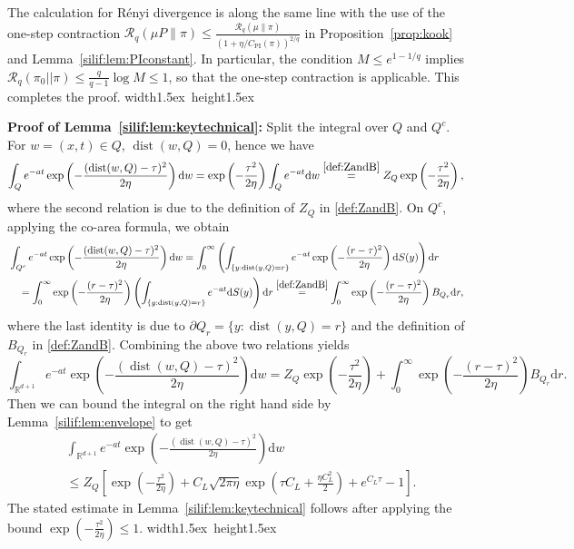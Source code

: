 \documentclass[11pt,letterpaper]{article}
\newcommand{\R}{\mathbb{R}}
\newcommand{\dist}{\operatorname{dist}}
\newcommand{\D}{\mathrm{d}}
\newcommand{\brac}[1]{\left( #1\right)}
\newcommand*{\QEDA}{\hfill\hbox{\vrule width1.5ex height1.5ex}}
\begin{document}
The calculation for R\'{e}nyi divergence is along the same line with the use of the one-step contraction $\mathcal{R}_q(\mu P\|\pi)\le \frac{\mathcal{R}_q(\mu\|\pi)}{(1+\eta/C_{\mathrm{PI}}(\pi))^{2/q}}$ in Proposition~\ref{prop:kook} and Lemma~\ref{silif:lem:PIconstant}. In particular, the condition $M\leq e^{1-1/q}$ implies $\mathcal{R}_q\brac{\pi_0||\pi}\leq \frac{q}{q-1}\log M\leq 1$, so that the one-step contraction is applicable. This completes the proof. 
\QEDA



\medskip
\textbf{Proof of Lemma~\ref{silif:lem:keytechnical}:}    
Split the integral over $Q$ and $  Q^c$. For $w=(x,t) \in Q$, $\dist(w,Q)=0$, hence we have
\[
\int_Q e^{-a t}\exp \left(-\frac{(\dist(w,Q)-\tau)^2}{2\eta}\right)  \D w
=\exp \left(-\frac{\tau^2}{2\eta}\right)\int_Q e^{-a t}  \D w
\stackrel{\eqref{def:ZandB}}=Z_Q\exp \left(-\frac{\tau^2}{2\eta}\right),
\]
where the second relation is due to the definition of $Z_Q$ in \eqref{def:ZandB}.
On $Q^c$, applying the co-area formula, we obtain
\begin{align*}
&\int_{  Q^c} e^{-a t}\exp \left(-\frac{(\dist(w,Q)-\tau)^2}{2\eta}\right)  \D w
=\int_{0}^{\infty}\left(\int_{\{y:\dist(y,Q)=r\}}
e^{-a t}\exp \left(-\frac{(r-\tau)^2}{2\eta}\right)  \D S(y)\right)\D r\\
&\quad=\int_0^\infty \exp \left(-\frac{(r-\tau)^2}{2\eta}\right)  
\left(\int_{\{y:\dist (y,Q)=r\}} e^{-a t}  \D S(y)\right)\D r\stackrel{\eqref{def:ZandB}}=\int_0^\infty \exp \left(-\frac{(r-\tau)^2}{2\eta}\right)  B_{Q_r}  \D r,
\end{align*}
where the last identity is due to $\partial Q_r=\{y:\dist(y,Q)= r\}$ and the definition of $B_{Q_r}$ in \eqref{def:ZandB}.
Combining the above two relations yields 
\[ \int_{\R^{d+1}} e^{-a t}  
\exp \left(-\frac{(\dist(w,Q)-\tau)^2}{2\eta}\right)  \D w
=
Z_Q\exp \left(-\frac{\tau^2}{2\eta}\right)
+ \int_0^\infty \exp \left(-\frac{(r-\tau)^2}{2\eta}\right)  B_{Q_r}  \D r.\]
Then we can bound the integral on the right hand side by Lemma~\ref{silif:lem:envelope} to get
\begin{align*}
& \int_{\R^{d+1}} e^{-a t}  
\exp \left(-\frac{(\dist(w,Q)-\tau)^2}{2\eta}\right)  \D w\\
&\leq  Z_Q\left[\exp \left(-\frac{\tau^2}{2\eta}\right)+C_L   \sqrt{2\pi\eta}
\exp \left(\tau C_L + \frac{\eta C_L^2}{2}\right)+e^{C_L\tau}-1\right]. 
\end{align*}
 The stated estimate in Lemma~\ref{silif:lem:keytechnical} follows after applying the bound $\exp \left(-\frac{\tau^2}{2\eta}\right)\le 1$. 
\QEDA
\end{document}
